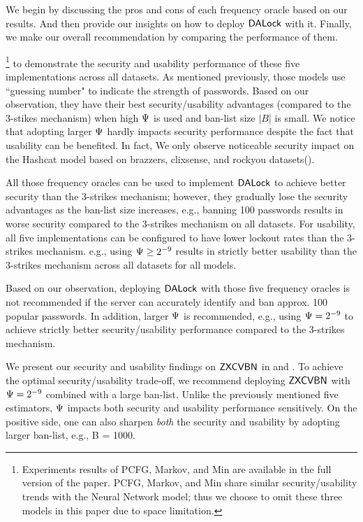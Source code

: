 We begin by discussing the pros and cons of each frequency oracle based on our results. And then provide our insights on how to deploy $\mathsf{DALock}$ with it. Finally, we make our overall recommendation by comparing the performance of them.

\footnote{Experiments results of PCFG, Markov, and Min are available in the full version of the paper. PCFG, Markov, and Min share similar security/usability trends with the Neural Network model; thus we choose to omit these three models in this paper due to space limitation.  }   to  demonstrate the security and usability performance of these five implementations across all datasets. As mentioned previously, those models use ``guessing number" to indicate the strength of passwords. Based on our observation, they have their best security/usability advantages (compared to the 3-stikes mechanism) when high $\Psi$ is used and ban-list size $|B|$ is small. We notice that adopting larger $\Psi$ hardly impacts security performance despite the fact that usability can be benefited. In fact, We only observe noticeable security impact on the Hashcat model based on brazzers, clixsense, and rockyou datasets().

All those frequency oracles can be used to implement $\mathsf{DALock}$ to achieve better security than the 3-strikes mechanism; however, they gradually lose the security advantages as the ban-list size increases, e.g., banning 100 passwords results in worse security compared to the 3-strikes mechanism on all datasets. For usability, all five implementations can be configured to have lower lockout rates than the 3-strikes mechanism. e.g., using $\Psi \ge 2^{-9}$ results in strictly better usability than the 3-strikes mechanism across all datasets for all models. 

Based on our observation, deploying $\mathsf{DALock}$ with those five frequency oracles is not recommended if the server can accurately identify and ban approx. 100 popular passwords. In addition, larger $\Psi$ is recommended, e.g., using $\Psi = 2^{-9}$ to achieve strictly better security/usability performance compared to the 3-strikes mechanism.


 We present our security and usability findings on $\mathsf{ZXCVBN}$ in  and . To achieve the optimal security/usability trade-off, we recommend deploying $\mathsf{ZXCVBN}$ with $\Psi =2^{-9}$ combined with a large ban-list. Unlike the previously mentioned five estimators, $\Psi$ impacts both security and usability performance sensitively. On the positive side, one can also sharpen \textit{both} the security and usability by adopting larger ban-list, e.g., B = 1000.

